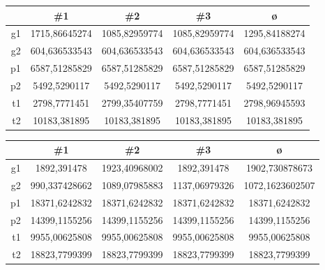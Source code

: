 \begin{center}
    \begin{tabular}{|r|S[table-format=5.9]|S[table-format=5.9]|S[table-format=5.9]|S[table-format=5.9]|}
        \hline
         & {\#1} & {\#2} & {\#3} & ø \\\hline
        g1 & 1715,86645274 & 1085,82959774 & 1085,82959774 & 1295,84188274 \\\hline
        g2 & 604,636533543 & 604,636533543 & 604,636533543 & 604,636533543 \\\hline
        p1 & 6587,51285829 & 6587,51285829 & 6587,51285829 & 6587,51285829 \\\hline
        p2 & 5492,5290117  & 5492,5290117  & 5492,5290117  & 5492,5290117  \\\hline
        t1 & 2798,7771451  & 2799,35407759 & 2798,7771451  & 2798,96945593 \\\hline
        t2 & 10183,381895  & 10183,381895  & 10183,381895  & 10183,381895  \\\hline
    \end{tabular}
\end{center}

\begin{center}
    \begin{tabular}{|r|S[table-format=5.9]|S[table-format=5.8]|S[table-format=5.8]|S[table-format=5.10]|}
        \hline
         & {\#1} & {\#2} & {\#3} & ø \\\hline
        g1 & 1892,391478   & 1923,40968002 & 1892,391478   & 1902,730878673  \\\hline
        g2 & 990,337428662 & 1089,07985883 & 1137,06979326 & 1072,1623602507 \\\hline
        p1 & 18371,6242832 & 18371,6242832 & 18371,6242832 & 18371,6242832   \\\hline
        p2 & 14399,1155256 & 14399,1155256 & 14399,1155256 & 14399,1155256   \\\hline
        t1 & 9955,00625808 & 9955,00625808 & 9955,00625808 & 9955,00625808   \\\hline
        t2 & 18823,7799399 & 18823,7799399 & 18823,7799399 & 18823,7799399   \\\hline
    \end{tabular}
\end{center}
